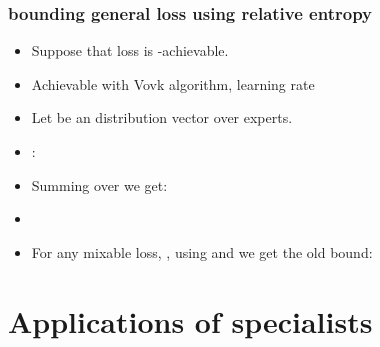 \documentclass{beamer}
\begin{document}
\begin{small}
\iffalse
\begin{frame}
\frametitle{Using relative entropy to to express the bound}

\begin{itemize}
\item Relative Entropy:
\R{\[
\RE{\vu}{\vv}
\]}
\item Normalized weights 
\R{$v_i^t = \frac{w_i^t}{\sum_j w_j^t}$}
\item
\R{\[
\forall \vu \RE{\vu}{\vp^{t+1}} - \RE{\vu}{\vp^t} =
\ell_A^t - \vu \cdot \loss
\]}
\item For general \R{$(a,c)$}-achievable loss:
\R{\[
\forall \vu, \;\; \RE{\vu}{\vp^{t+1}} - \RE{\vu}{\vp^t}  \geq
(1/c) \ell_A^t - (a/c) \vu \cdot \boldell^t = 
\eta \ell_A^t - a \eta \vu \cdot \boldell^t
\]}
\end{itemize}
\end{frame}
\fi

\begin{frame}
\frametitle{bounding general loss using relative entropy}

\begin{itemize}
\item Suppose that loss is -achievable. 
\item Achievable with Vovk algorithm, learning rate 
\item Let \R{$\vu$} be an  distribution vector over experts.
\item {}:
\item Summing over  we get:
\item
{}
\item For any mixable loss, , using  and  we get the old bound:
\end{itemize}
\end{frame}

\section{Applications of specialists}


\end{small}
\end{document}
